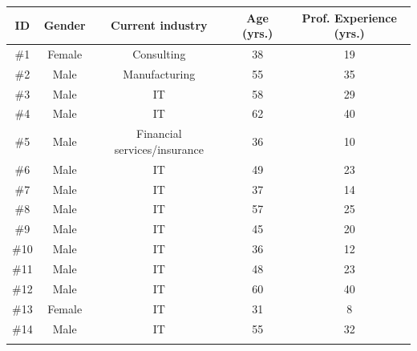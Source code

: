 \begin{table}[!hbt]
\centering
\captionsetup{font=small}
\footnotesize
    \begin{tabular}{|c|c|c|c|c|}
    \hline
    ID   & Gender                 & Current industry & Age (yrs.)        & Prof. Experience (yrs.) \\ \hline
    \#1  & Female                 & Consulting                     & 38                & 19                      \\ \hdashline
    \#2  & Male                   & Manufacturing                  & 55                & 35                      \\ \hdashline
    \#3  & Male                   & IT                             & 58                & 29                      \\ \hdashline
    \#4  & Male                   & IT                             & 62                & 40                      \\ \hdashline
    \#5  & Male                   & Financial services/insurance   & 36                & 10                      \\\hdashline
    \#6  & Male                   & IT                             & 49                & 23                      \\\hdashline
    \#7  & Male                   & IT                             & 37                & 14                      \\\hdashline
    \#8  & Male                   & IT                             & 57                & 25                      \\\hdashline
    \#9  & Male                   & IT                             & 45                & 20                      \\\hdashline
    \#10 & Male                   & IT                             & 36                & 12                      \\\hdashline
    \#11 & Male                   & IT                             & 48                & 23                      \\\hdashline
    \#12 & Male                   & IT                             & 60                & 40                      \\\hdashline
    \#13 & Female                 & IT                             & 31                & 8                       \\\hdashline
    \#14 & Male                   & IT                             & 55                & 32                      \\\hdashline

\end{tabular}
\end{table}
